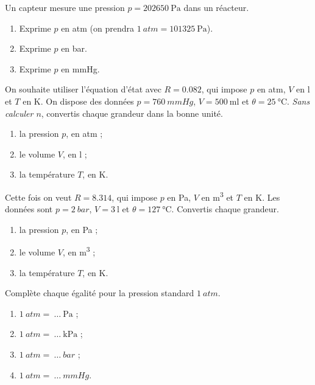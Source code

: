 \documentclass[11pt,a4paper]{article}
\begin{document}
\begin{exo}
Un capteur mesure une pression $p=\qty{202650}{\pascal}$ dans un réacteur.
\begin{enumerate}[label=\alph*)]
  \item Exprime $p$ en \si{atm} (on prendra $\qty{1}{atm}=\qty{101325}{\pascal}$).
  \item Exprime $p$ en \si{bar}.
  \item Exprime $p$ en \si{mmHg}.
\end{enumerate}
\end{exo}

\begin{exo}[préparer $pV=nRT$ avec $R=\qty{0.082}{atm.L.mol^{-1}.K^{-1}}$]
On souhaite utiliser l'équation d'état avec $R=\num{0,082}$, qui impose $p$ en \si{atm}, $V$ en
\si{\litre} et $T$ en \si{\kelvin}. On dispose des données $p=\qty{760}{mmHg}$, $V=\qty{500}{\milli\litre}$
et $\theta=\qty{25}{\degreeCelsius}$. \emph{Sans calculer $n$}, convertis chaque grandeur dans la bonne
unité.
\begin{enumerate}[label=\alph*)]
  \item la pression $p$, en \si{atm} ;
  \item le volume $V$, en \si{\litre} ;
  \item la température $T$, en \si{\kelvin}.
\end{enumerate}
\end{exo}

\begin{exo}[préparer $pV=nRT$ avec $R=\qty{8.314}{\joule\per\mole\per\kelvin}$]
Cette fois on veut $R=\num{8,314}$, qui impose $p$ en \si{\pascal}, $V$ en \si{\meter\cubed} et $T$ en
\si{\kelvin}. Les données sont $p=\qty{2}{bar}$, $V=\qty{3}{\litre}$ et $\theta=\qty{127}{\degreeCelsius}$.
Convertis chaque grandeur.
\begin{enumerate}[label=\alph*)]
  \item la pression $p$, en \si{\pascal} ;
  \item le volume $V$, en \si{\meter\cubed} ;
  \item la température $T$, en \si{\kelvin}.
\end{enumerate}
\end{exo}

\begin{exo}
Complète chaque égalité pour la pression standard $\qty{1}{atm}$.
\begin{enumerate}[label=\alph*)]
  \item $\qty{1}{atm}=\ \ldots\ \si{\pascal}$ ;
  \item $\qty{1}{atm}=\ \ldots\ \si{\kilo\pascal}$ ;
  \item $\qty{1}{atm}=\ \ldots\ \si{bar}$ ;
  \item $\qty{1}{atm}=\ \ldots\ \si{mmHg}$.
\end{enumerate}
\end{exo}
\end{document}
